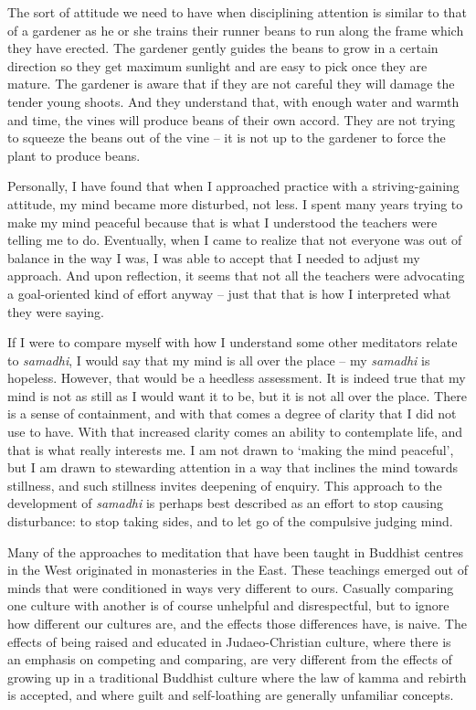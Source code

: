 The sort of attitude we need to have when disciplining attention is
similar to that of a gardener as he or she trains their
runner beans\cite{beans} to run along the frame which they have erected. The
gardener gently guides the beans to grow in a certain direction so they
get maximum sunlight and are easy to pick once they are mature. The
gardener is aware that if they are not careful they will damage the
tender young shoots. And they understand that, with enough water and
warmth and time, the vines will produce beans of their own accord. They
are not trying to squeeze the beans out of the vine -- it is not up to
the gardener to force the plant to produce beans.

\enlargethispage{\baselineskip}

Personally, I have found that when I approached practice with a
striving-gaining attitude, my mind became more disturbed, not less. I
spent many years trying to make my mind peaceful because that is what I
understood the teachers were telling me to do. Eventually, when I came
to realize that not everyone was out of balance in the way I was, I was
able to accept that I needed to adjust my approach. And upon reflection,
it seems that not all the teachers were advocating a goal-oriented kind
of effort anyway -- just that that is how I interpreted what they were
saying.

If I were to compare myself with how I understand some other meditators
relate to \emph{samadhi}, I would say that my mind is all over the place
-- my \emph{samadhi} is hopeless. However, that would be a heedless
assessment. It is indeed true that my mind is not as still as I would
want it to be, but it is not all over the place. There is a sense of
containment, and with that comes a degree of clarity that I did not use
to have. With that increased clarity comes an ability to contemplate
life, and that is what really interests me. I am not drawn to `making
the mind peaceful', but I am drawn to stewarding attention in a way that
inclines the mind towards stillness, and such stillness invites
deepening of enquiry. This approach to the development of \emph{samadhi}
is perhaps best described as an effort to stop causing disturbance: to
stop taking sides, and to let go of the compulsive judging mind.

Many of the approaches to meditation that have been taught in Buddhist
centres in the West originated in monasteries in the East. These
teachings emerged out of minds that were conditioned in ways very
different to ours. Casually comparing one culture with another is of
course unhelpful and disrespectful, but to ignore how different our
cultures are, and the effects those differences have, is naive. The
effects of being raised and educated in Judaeo-Christian culture, where
there is an emphasis on competing and comparing, are very different
from the effects of growing up in a traditional Buddhist culture where
the law of kamma and rebirth is accepted, and where guilt and
self-loathing are generally unfamiliar concepts.

